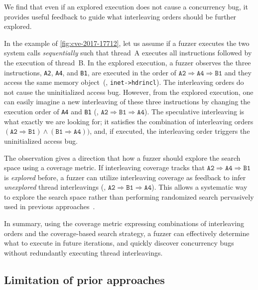 %
We find that even if an explored execution does not cause 
a concurrency bug, it provides useful feedback 
to guide what interleaving orders should be further explored.

In the example of \autoref{fig:cve-2017-17712}, let us assume 
if a fuzzer executes the two system calls \textit{sequentially} 
such that thread~A executes all instructions followed by the execution of thread~B. 
In the explored execution, a fuzzer observes the three
instructions, \texttt{A2}, \texttt{A4}, and \texttt{B1}, are executed
in the order of
$\texttt{A2} \Rightarrow \texttt{A4} \Rightarrow \texttt{B1}$ and
they access the same memory object~(\ie, \texttt{inet->hdrincl}).
%
The interleaving orders do not cause the uninitialized access bug.
%
However, from the explored execution, one can easily imagine a new interleaving of these three
instructions by changing the execution order of \texttt{A4} and
\texttt{B1} (\ie,
$\texttt{A2} \Rightarrow \texttt{B1} \Rightarrow \texttt{A4}$).
%
The speculative interleaving is what exactly we are looking for; it
satisfies the combination of interleaving orders
$(\texttt{A2} \Rightarrow \texttt{B1}) \wedge (\texttt{B1} \Rightarrow
\texttt{A4}))$, and, if executed, the interleaving order triggers 
the uninitialized access bug.

The observation gives a direction that how a fuzzer should explore 
the search space using a coverage metric.
If interleaving coverage tracks that
$\texttt{A2} \Rightarrow \texttt{A4} \Rightarrow \texttt{B1}$ is
\textit{explored} before, a fuzzer can utilize interleaving
coverage as feedback to infer \textit{unexplored} thread interleavings (\eg,
$\texttt{A2} \Rightarrow \texttt{B1} \Rightarrow \texttt{A4}$). 
This allows a systematic way to explore the search space rather than 
performing randomized search pervasively used in previous approaches~\cite{ski, krace, pctalgorithm, muzz}.%

In summary, using the coverage metric expressing combinations of interleaving orders and the coverage-based search strategy, a fuzzer can effectively determine what to execute in future iterations, and quickly discover concurrency bugs
without redundantly executing thread interleavings.

\subsection{Limitation of prior approaches}
\label{ss:existingapproaches}
%
%   

